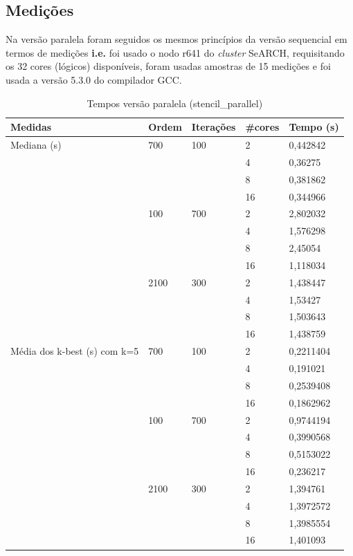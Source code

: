 \documentclass{article}
\begin{document}
\subsection{Medições}
Na versão paralela foram seguidos os mesmos princípios da versão sequencial em termos de medições \textbf{i.e.} foi usado o nodo r641 do \textit{cluster} SeARCH, requisitando os 32 cores (lógicos) disponíveis, foram usadas amostras de 15 medições e foi usada a versão 5.3.0 do compilador GCC.
\begin{table}[H]
    \centering
    \begin{tabular}{| l | l | l | l | l |}
    \hline			
    \textbf{Medidas} & \textbf{Ordem} & \textbf{Iterações} & \textbf{\#cores} & \textbf{Tempo (s)} \\ \hline
    Mediana (s) & 700 & 100 & 2 & 0,442842 \\
               &     &     & 4 & 0,36275 \\
               &     &     & 8 & 0,381862 \\
               &     &     & 16 & 0,344966 \\ \cline{2-5}
               & 100 & 700 & 2 & 2,802032 \\
               &     &     & 4 & 1,576298 \\
               &     &    & 8 & 2,45054 \\
               &     &    & 16 & 1,118034 \\ \cline{2-5}
               & 2100 & 300 & 2 & 1,438447 \\
               &      &     & 4 & 1,53427 \\
               &      &     & 8 & 1,503643 \\
               &      &     & 16 & 1,438759 \\
    \hline
    Média dos k-best (s) com k=5 & 700 & 100 & 2 & 0,2211404 \\
                                &     &     & 4 & 0,191021 \\
                                &     &     & 8 & 0,2539408 \\
                                &     &     & 16 & 0,1862962 \\ \cline{2-5}
                                & 100 & 700 & 2 & 0,9744194 \\
                                &     &     & 4 & 0,3990568 \\
                                &     &     & 8 & 0,5153022 \\
                                &     &     & 16 & 0,236217 \\ \cline{2-5}
                                & 2100 & 300 & 2 & 1,394761 \\
                                &      &     & 4 & 1,3972572 \\
                                &      &     & 8 & 1,3985554 \\
                                &      &     & 16 & 1,401093 \\
    \hline
    \end{tabular}    
    \caption{Tempos versão paralela (stencil\_parallel)}
    \label{tab:parallel_times}
\end{table}
\end{document}
